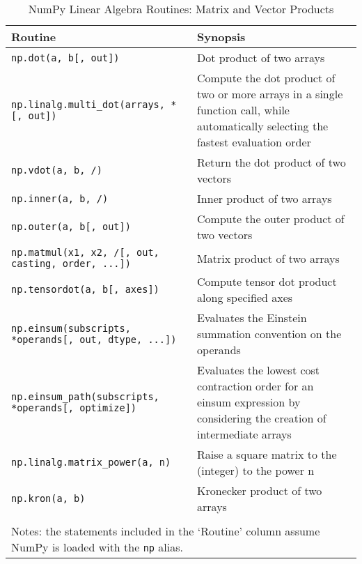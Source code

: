 \documentclass[a4paper,11pt]{book}
\numberwithin{figure}{chapter}
\numberwithin{table}{chapter}
\begin{document}
\begin{sidewaystable}[!htbp]
	\centering
	\caption{NumPy Linear Algebra Routines: Matrix and Vector Products}
	\label{tab:matrix_and_vector_products}
	\begin{tabular}{lp{12cm}}
		\toprule \toprule
			Routine & Synopsis \\
			\midrule
                        \texttt{np.dot(a, b[, out])}&
                        Dot product of two arrays\\
                        \texttt{np.linalg.multi\_dot(arrays, *[, out])}&
                        Compute the dot product of two or more arrays in a single function call, while automatically selecting the fastest evaluation order\\
                        \texttt{np.vdot(a, b, /)}&
                        Return the dot product of two vectors\\
                        \texttt{np.inner(a, b, /)}&
                        Inner product of two arrays\\
                        \texttt{np.outer(a, b[, out])}&
                        Compute the outer product of two vectors\\
                        \texttt{np.matmul(x1, x2, /[, out, casting, order, ...])}&
                        Matrix product of two arrays\\
                        \texttt{np.tensordot(a, b[, axes])}&
                        Compute tensor dot product along specified axes\\
                        \texttt{np.einsum(subscripts, *operands[, out, dtype, ...])}&
                        Evaluates the Einstein summation convention on the operands\\
                        \texttt{np.einsum\_path(subscripts, *operands[, optimize])}&
                        Evaluates the lowest cost contraction order for an einsum expression by considering the creation of intermediate arrays\\
                        \texttt{np.linalg.matrix\_power(a, n)}&
                        Raise a square matrix to the (integer) to the power n\\
                        \texttt{np.kron(a, b)}&
                        Kronecker product of two arrays\\
	     	\bottomrule \\[-1.8ex]
	        \multicolumn{2}{l}{Notes: the statements included in the `Routine' column assume NumPy is loaded with the \texttt{np} alias.} \\
	\end{tabular}
\end{sidewaystable}
\end{document}
